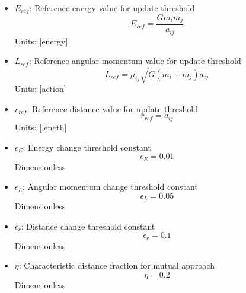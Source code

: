 \documentclass{article}
\begin{document}
\begin{itemize}
\item $E_{ref}$: Reference energy value for update threshold
    \begin{equation}
    E_{ref} = \frac{G m_i m_j}{a_{ij}}
    \end{equation}
    Units: [energy]
    
\item $L_{ref}$: Reference angular momentum value for update threshold
    \begin{equation}
    L_{ref} = \mu_{ij}\sqrt{G(m_i+m_j)a_{ij}}
    \end{equation}
    Units: [action]
    
\item $r_{ref}$: Reference distance value for update threshold
    \begin{equation}
    r_{ref} = a_{ij}
    \end{equation}
    Units: [length]
    
\item $\epsilon_E$: Energy change threshold constant
    \begin{equation}
    \epsilon_E = 0.01
    \end{equation}
    Dimensionless
    
\item $\epsilon_L$: Angular momentum change threshold constant
    \begin{equation}
    \epsilon_L = 0.05
    \end{equation}
    Dimensionless
    
\item $\epsilon_r$: Distance change threshold constant
    \begin{equation}
    \epsilon_r = 0.1
    \end{equation}
    Dimensionless
    
\item $\eta$: Characteristic distance fraction for mutual approach
    \begin{equation}
    \eta = 0.2
    \end{equation}
    Dimensionless
\end{itemize}
\end{document}
